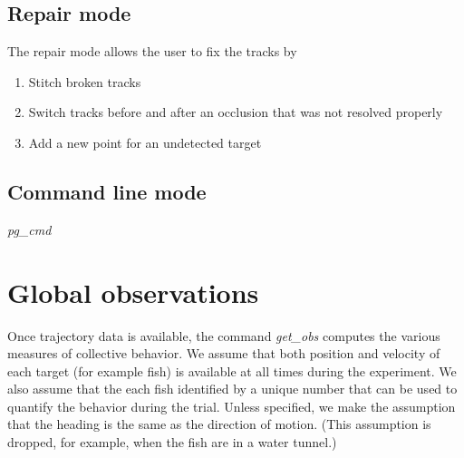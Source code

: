 \documentclass[12pt]{article}
\begin{document}
\subsection{Repair mode}
The repair mode allows the user to fix the tracks by
\begin{enumerate}
\item Stitch broken tracks
\item Switch tracks before and after an occlusion that was not resolved properly
\item Add a new point for an undetected target
\end{enumerate}

\subsection{Command line mode}
\emph{pg\_cmd}
\section{Global observations}

Once trajectory data is available, the command \emph{get\_obs} computes the  various measures of collective behavior. We assume that both position and velocity of each target (for example fish) is available at all times during the experiment. We also assume that the each fish identified by a unique number that can be used to quantify the behavior during the trial. Unless specified, we make the assumption that the heading is the same as the direction of motion. (This assumption is dropped, for example, when the fish are in a water tunnel.)
\end{document}
